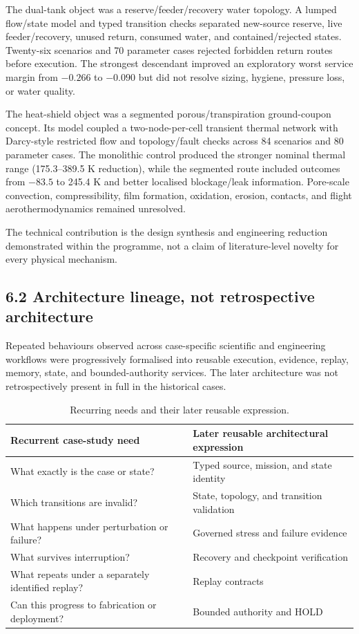 \documentclass[10pt,a4paper]{article}
\begin{document}
The dual-tank object was a reserve/feeder/recovery water topology. A lumped flow/state model and typed transition checks separated new-source reserve, live feeder/recovery, unused return, consumed water, and contained/rejected states. Twenty-six scenarios and 70 parameter cases rejected forbidden return routes before execution. The strongest descendant improved an exploratory worst service margin from $-0.266$ to $-0.090$ but did not resolve sizing, hygiene, pressure loss, or water quality.

The heat-shield object was a segmented porous/transpiration ground-coupon concept. Its model coupled a two-node-per-cell transient thermal network with Darcy-style restricted flow and topology/fault checks across 84 scenarios and 80 parameter cases. The monolithic control produced the stronger nominal thermal range (175.3--389.5 K reduction), while the segmented route included outcomes from $-83.5$ to 245.4 K and better localised blockage/leak information. Pore-scale convection, compressibility, film formation, oxidation, erosion, contacts, and flight aerothermodynamics remained unresolved.

The technical contribution is the design synthesis and engineering reduction demonstrated within the programme, not a claim of literature-level novelty for every physical mechanism.

\subsection{6.2 Architecture lineage, not retrospective architecture}
Repeated behaviours observed across case-specific scientific and engineering workflows were progressively formalised into reusable execution, evidence, replay, memory, state, and bounded-authority services. The later architecture was not retrospectively present in full in the historical cases.

\begin{table}[htbp]\centering\small
\caption{Recurring needs and their later reusable expression.}
\begin{tabularx}{\linewidth}{@{}X X@{}}\toprule
Recurrent case-study need & Later reusable architectural expression\\\midrule
What exactly is the case or state? & Typed source, mission, and state identity\\
Which transitions are invalid? & State, topology, and transition validation\\
What happens under perturbation or failure? & Governed stress and failure evidence\\
What survives interruption? & Recovery and checkpoint verification\\
What repeats under a separately identified replay? & Replay contracts\\
Can this progress to fabrication or deployment? & Bounded authority and HOLD\\
\bottomrule\end{tabularx}\end{table}
\end{document}
